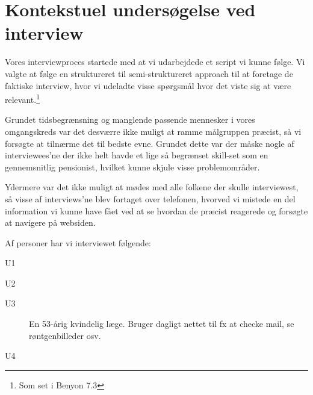 \section{Kontekstuel undersøgelse ved interview}

Vores interviewproces startede med at vi udarbejdede et script vi kunne følge. Vi valgte at følge en struktureret til semi-struktureret approach til at foretage de faktiske interview, hvor vi udeladte visse spørgsmål hvor det viste sig at være relevant.\footnote{Som set i Benyon 7.3}

Grundet tidsbegrænsning og manglende passende mennesker i vores omgangskreds var det desværre ikke muligt at ramme målgruppen præcist, så vi forsøgte at tilnærme det til bedste evne. Grundet dette var der måske nogle af interviewees'ne der ikke helt havde et lige så begrænset skill-set som en gennemsnitlig pensionist, hvilket kunne skjule visse problemområder.

Ydermere var det ikke muligt at mødes med alle folkene der skulle interviewest, så visse af interviews'ne blev fortaget over telefonen, hvorved vi mistede en del information vi kunne have fået ved at se hvordan de præcist reagerede og forsøgte at navigere på websiden.

Af personer har vi interviewet følgende:

\begin{description}
    \item[U1] {
    }
    \item[U2] {
    }
    \item[U3] {
    En 53-årig kvindelig læge. Bruger dagligt nettet til fx at checke mail, se røntgenbilleder osv.
    }
    \item[U4] {
    }
\end{description}

